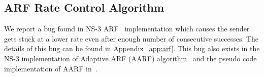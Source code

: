 \subsection{ARF Rate Control Algorithm}
\label{subsec:arf}

We report a bug found in NS-3 ARF~\cite{kamerman1997wavelan} implementation
which causes the sender gets stuck at a lower rate even after enough number of
consecutive successes. The details of this bug can be found in
Appendix~\ref{app:arf}. This bug also exists in the NS-3 implementation of
Adaptive ARF (AARF) algorithm~\cite{lacage2004ieee} and the pseudo code
implementation of AARF in~\cite{lacage2004report}.
